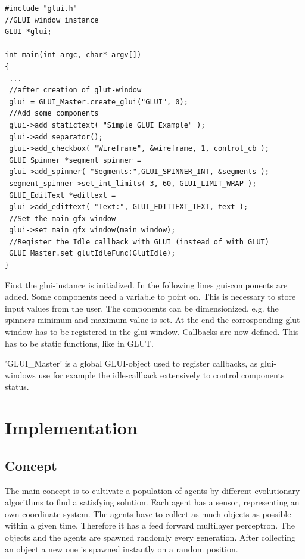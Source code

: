 \documentclass[10pt,a4paper,DIV=11]{scrreprt}
\begin{document}
\begin{lstlisting}[caption={Creating a GLUI-window},label=lst:glui-create]
#include "glui.h"
//GLUI window instance
GLUI *glui;

int main(int argc, char* argv[])
{
 ...
 //after creation of glut-window
 glui = GLUI_Master.create_glui("GLUI", 0);
 //Add some components
 glui->add_statictext( "Simple GLUI Example" );
 glui->add_separator();
 glui->add_checkbox( "Wireframe", &wireframe, 1, control_cb );
 GLUI_Spinner *segment_spinner =
 glui->add_spinner( "Segments:",GLUI_SPINNER_INT, &segments );
 segment_spinner->set_int_limits( 3, 60, GLUI_LIMIT_WRAP );
 GLUI_EditText *edittext =
 glui->add_edittext( "Text:", GLUI_EDITTEXT_TEXT, text );
 //Set the main gfx window
 glui->set_main_gfx_window(main_window);
 //Register the Idle callback with GLUI (instead of with GLUT)
 GLUI_Master.set_glutIdleFunc(GlutIdle);
}
\end{lstlisting}

First the glui-instance is initialized. In the following lines gui-components are added. Some components need a variable to point on. This is necessary to store input values from the user. The components can be dimensionized, e.g. the spinners minimum and maximum value is set.
At the end the corrosponding glut window has to be registered in the glui-window.
Callbacks are now defined. This has to be static functions, like in GLUT.

'GLUI\_Master' is a global GLUI-object used to register callbacks, as glui-windows use for example the idle-callback extensively to control components status.

\chapter{Implementation}

\section{Concept}
The main concept is to cultivate a population of agents by different evolutionary algorithms to find a satisfying solution. Each agent has a sensor, representing an own coordinate system. The agents have to collect as much objects as possible within a given time. Therefore it has a feed forward multilayer perceptron.
The objects and the agents are spawned randomly every generation. After collecting an object a new one is spawned instantly on a random position.
\end{document}
